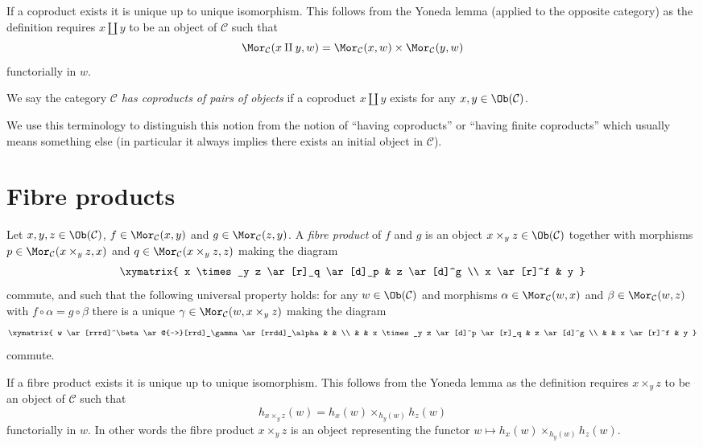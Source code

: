 \noindent
If a coproduct exists it is unique up to unique
isomorphism. This follows from the Yoneda lemma (applied to the
opposite category) as
the definition requires $x \amalg y$ to be an object
of $\mathcal{C}$ such that
$$
\Mor_\mathcal{C}(x \amalg y, w) =
\Mor_\mathcal{C}(x, w) \times \Mor_\mathcal{C}(y, w)
$$
functorially in $w$.

\begin{definition}
\label{definition-has-coproducts-of-pairs}
We say the category $\mathcal{C}$ {\it has coproducts of pairs
of objects} if a coproduct $x \amalg y$
exists for any $x, y \in \Ob(\mathcal{C})$.
\end{definition}

\noindent
We use this terminology to distinguish this notion from the notion
of ``having coproducts'' or ``having finite coproducts'' which usually means
something else (in particular it always implies there exists an
initial object in $\mathcal{C}$).





\section{Fibre products}
\label{section-fibre-products}

\begin{definition}
\label{definition-fibre-products}
Let $x, y, z\in \Ob(\mathcal{C})$,
$f\in \Mor_\mathcal{C}(x, y)$
and $g\in \Mor_{\mathcal C}(z, y)$.
A {\it fibre product} of $f$ and $g$ is
an object $x \times_y z\in \Ob(\mathcal{C})$
together with morphisms
$p \in \Mor_{\mathcal C}(x \times_y z, x)$ and
$q \in \Mor_{\mathcal C}(x \times_y z, z)$ making the diagram
$$
\xymatrix{
x \times_y z \ar[r]_q \ar[d]_p & z \ar[d]^g \\
x \ar[r]^f & y
}
$$
commute, and such that the following universal property holds: for
any $w\in \Ob(\mathcal{C})$ and morphisms
$\alpha \in \Mor_{\mathcal C}(w, x)$ and
$\beta \in \Mor_\mathcal{C}(w, z)$ with
$f \circ \alpha = g \circ \beta$
there is a unique
$\gamma \in \Mor_{\mathcal C}(w, x \times_y z)$ making
the diagram
$$
\xymatrix{
w \ar[rrrd]^\beta \ar@{-->}[rrd]_\gamma \ar[rrdd]_\alpha & & \\
& & x \times_y z \ar[d]^p \ar[r]_q & z \ar[d]^g \\
& & x \ar[r]^f & y
}
$$
commute.
\end{definition}

\noindent
If a fibre product exists it is unique up to unique
isomorphism. This follows from the Yoneda lemma as
the definition requires $x \times_y z$ to be an object
of $\mathcal{C}$ such that
$$
h_{x \times_y z}(w) = h_x(w) \times_{h_y(w)} h_z(w)
$$
functorially in $w$. In other words the fibre product $x \times_y z$
is an object representing the functor
$w \mapsto h_x(w) \times_{h_y(w)} h_z(w)$.

